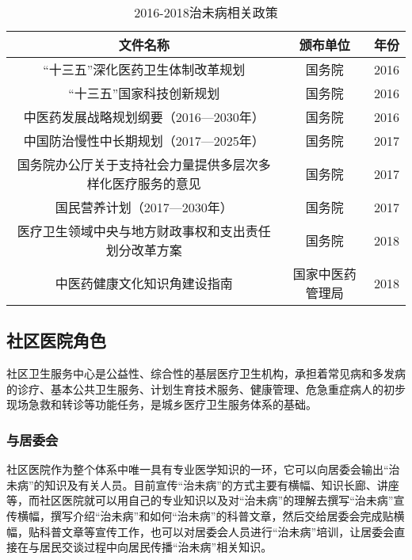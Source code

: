 \begin{spacing}{1.19}
\begin{table}[]
    \centering
    \begin{tabular}{|c|c|c|}
        \hline
        \rowcolor[HTML]{FFFFFF} 
        文件名称                          & 颁布单位     & 年份   \\ \hline
        \rowcolor[HTML]{FFFFFF} 
        “十三五”深化医药卫生体制改革规划             & 国务院      & 2016 \\ \hline
        \rowcolor[HTML]{FFFFFF} 
        “十三五”国家科技创新规划                 & 国务院      & 2016 \\ \hline
        中医药发展战略规划纲要（2016—2030年）       & 国务院      & 2016 \\ \hline
        中国防治慢性中长期规划（2017—2025年）       & 国务院      & 2017 \\ \hline
        国务院办公厅关于支持社会力量提供多层次多样化医疗服务的意见 & 国务院      & 2017 \\ \hline
        国民营养计划（2017—2030年）            & 国务院      & 2017 \\ \hline
        医疗卫生领域中央与地方财政事权和支出责任划分改革方案    & 国务院      & 2018 \\ \hline
        中医药健康文化知识角建设指南                & 国家中医药管理局 & 2018 \\ \hline
    \end{tabular}
    \caption{2016-2018治未病相关政策}
\end{table}

\end{spacing}
\subsection{社区医院角色}
社区卫生服务中心是公益性、综合性的基层医疗卫生机构，承担着常见病和多发病的诊疗、基本公共卫生服务、计划生育技术服务、健康管理、危急重症病人的初步现场急救和转诊等功能任务，是城乡医疗卫生服务体系的基础。
\subsubsection{与居委会}
社区医院作为整个体系中唯一具有专业医学知识的一环，它可以向居委会输出“治未病”的知识及有关人员。目前宣传“治未病”的方式主要有横幅、知识长廊、讲座等，而社区医院就可以用自己的专业知识以及对“治未病”的理解去撰写“治未病”宣传横幅，撰写介绍“治未病”和如何“治未病”的科普文章，然后交给居委会完成贴横幅，贴科普文章等宣传工作，也可以对居委会人员进行“治未病”培训，让居委会直接在与居民交谈过程中向居民传播“治未病”相关知识。

